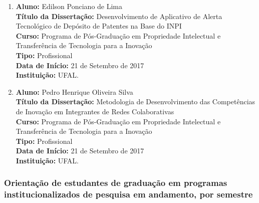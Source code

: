 \documentclass[a4paper,oneside,10pt]{article}
\begin{document}
\begin{enumerate}
\renewcommand{\labelenumi}{{\large\bfseries\arabic{enumi}.}}

\item   \textbf{Aluno:} Edilson Ponciano de Lima \mbox{} \\
            \textbf{Título da Dissertação:} Desenvolvimento de Aplicativo de Alerta Tecnológico de Depósito de Patentes na Base do INPI \\
            \textbf{Curso:} Programa de Pós-Graduação em Propriedade Intelectual e Transferência de Tecnologia para a Inovação \\%
            \textbf{Tipo:} Profissional \\%
            \textbf{Data de Início:} 21 de Setembro de 2017 \\
            \textbf{Instituição:} UFAL.  
            
            \item   \textbf{Aluno:} Pedro Henrique Oliveira Silva\mbox{} \\
            \textbf{Título da Dissertação:} Metodologia de Desenvolvimento das Competências de Inovação em Integrantes de Redes Colaborativas\\
            \textbf{Curso:} Programa de Pós-Graduação em Propriedade Intelectual e Transferência de Tecnologia para a Inovação \\%
            \textbf{Tipo:} Profissional \\%
            \textbf{Data de Início:} 21 de Setembro de 2017\\
            \textbf{Instituição:} UFAL.  
            

\end{enumerate}


\subsubsection{Orientação de estudantes de graduação em programas institucionalizados de pesquisa em andamento, por semestre}
\vspace{0.3cm}
\end{document}
